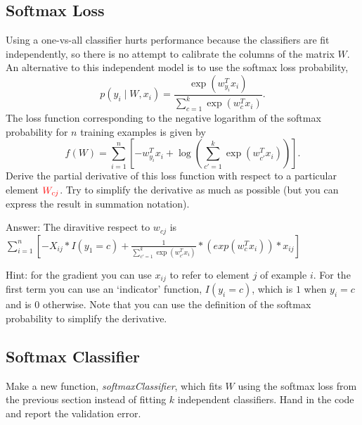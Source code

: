 \documentclass{article}
\def\ans#1{\par\gre{Answer: #1}}
\def\blu#1{{\color{blu}#1}}
\def\gre#1{{\color{gre}#1}}
\def\red#1{{\color{red}#1}}
\def\cond{\; | \;}
\begin{document}
\subsection{Softmax Loss}

Using a one-vs-all classifier hurts performance because the classifiers are fit independently, so there is no attempt to calibrate the columns of the matrix $W$. An alternative to this independent model is to use the softmax loss probability,
\[
p(y_i \cond W, x_i) = \frac{\exp(w_{y_i}^Tx_i)}{\sum_{c=1}^k\exp(w_c^Tx_i)}.
\]
The loss function corresponding to the negative logarithm of the softmax probability for $n$ training examples is given by
\[
f(W) = \sum_{i=1}^n \left[-w_{y_i}^Tx_i + \log\left(\sum_{c' = 1}^k \exp(w_{c'}^Tx_i)\right)\right].
\]
\blu{Derive the partial derivative of this loss function with respect to a particular element $\red{W_{cj}}$}. Try to simplify the derivative as much as possible (but you can express the result in summation notation).
\ans{The diravitive respect to $w_{cj}$ is $\sum _{i=1}^n [-X_{ij}*I(y_1=c) + \frac{1}{\sum_{c' = 1}^k \exp(w_{c'}^Tx_i)}* (exp(w_{c}^Tx_i))*x_{ij} ]$}

Hint: for the gradient you can use $x_{ij}$ to refer to element $j$ of example $i$. For the first term you can use an `indicator' function, $I(y_i = c)$, which is $1$ when $y_i = c$ and is $0$ otherwise. Note that you can use the definition of the softmax probability to simplify the derivative.



\subsection{Softmax Classifier}

Make a new function, \emph{softmaxClassifier}, which fits $W$ using the softmax loss from the previous section  instead of fitting $k$ independent classifiers. \blu{Hand in the code and report the validation error}.
\end{document}
